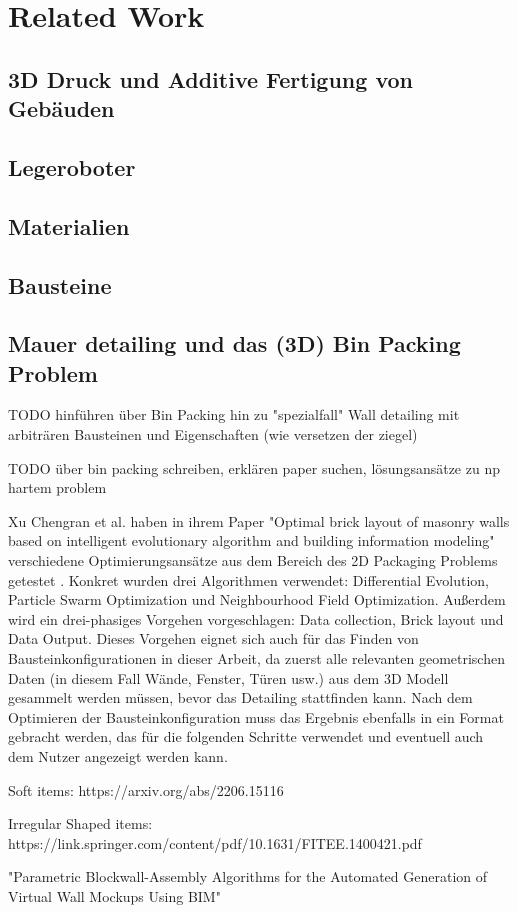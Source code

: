 \section{Related Work}
\subsection{3D Druck und Additive Fertigung von Gebäuden}
\subsection{Legeroboter}
\subsection{Materialien}
\subsection{Bausteine}
\subsection{Mauer detailing und das (3D) Bin Packing Problem}
TODO hinführen über Bin Packing hin zu "spezialfall" Wall detailing mit arbiträren Bausteinen und Eigenschaften (wie versetzen der ziegel)

TODO über bin packing schreiben, erklären paper suchen, lösungsansätze zu np hartem problem 

Xu Chengran et al. haben in ihrem Paper "Optimal brick layout of masonry walls based on intelligent evolutionary algorithm and building information modeling" verschiedene Optimierungsansätze aus dem Bereich des 2D Packaging Problems getestet \cite{Xu2021}.
Konkret wurden drei Algorithmen verwendet: Differential Evolution, Particle Swarm Optimization und Neighbourhood Field Optimization.
Außerdem wird ein drei-phasiges Vorgehen vorgeschlagen: Data collection, Brick layout und Data Output.
Dieses Vorgehen eignet sich auch für das Finden von Bausteinkonfigurationen in dieser Arbeit, da zuerst alle relevanten geometrischen Daten (in diesem Fall Wände, Fenster, Türen usw.) aus dem 3D Modell gesammelt werden müssen, bevor das Detailing stattfinden kann.
Nach dem Optimieren der Bausteinkonfiguration muss das Ergebnis ebenfalls in ein Format gebracht werden, das für die folgenden Schritte verwendet und eventuell auch dem Nutzer angezeigt werden kann.


Soft items: https://arxiv.org/abs/2206.15116

Irregular Shaped items: https://link.springer.com/content/pdf/10.1631/FITEE.1400421.pdf

"Parametric Blockwall-Assembly Algorithms for the Automated Generation of Virtual Wall Mockups Using BIM"
